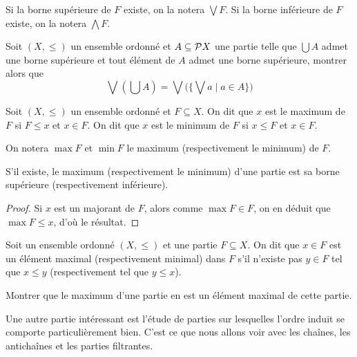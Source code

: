 \begin{notation}
  Si la borne supérieure de $F$ existe, on la notera $\bigvee F$. Si la borne
  inférieure de $F$ existe, on la notera $\bigwedge F$.
\end{notation}

\begin{exercise}
  Soit $(X,\leq)$ un ensemble ordonné et $A\subseteq \mathcal{P} X$ une partie
  telle que $\bigcup A$ admet une borne supérieure et tout élément de $A$ admet
  une borne supérieure, montrer alors que
  \[\bigvee (\bigcup A) =
  \bigvee\Big(\Big\{ \bigvee a \;\Big|\; a \in A\Big\}\Big)\]
\end{exercise}

\begin{definition}
  Soit $(X,\leq)$ un ensemble ordonné et $F\subseteq X$. On dit que $x$ est le
  maximum de $F$ si $F\leq x$ et $x\in F$. On dit que $x$ est le minimum de $F$
  si $x\leq F$ et $x\in F$.
\end{definition}

\begin{notation}
  On notera $\max F$ et $\min F$ le maximum (respectivement le minimum) de $F$.
\end{notation}

\begin{property}
  S'il existe, le maximum (respectivement le minimum) d'une partie est sa borne
  supérieure (respectivement inférieure).
\end{property}

\begin{proof}
  Si $x$ est un majorant de $F$, alors comme $\max F \in F$, on en déduit que
  $\max F \leq x$, d'où le résultat.
\end{proof}

\begin{definition}
  Soit un ensemble ordonné $(X,\leq)$ et une partie $F\subseteq X$. On dit que
  $x \in F$ est un élément maximal (respectivement minimal) dans $F$ s'il
  n'existe pas $y\in F$ tel que $x\leq y$ (respectivement tel que $y\leq x$).
\end{definition}

\begin{exercise}
  Montrer que le maximum d'une partie en est un élément maximal de cette partie.
\end{exercise}

Une autre partie intéressant est l'étude de parties sur lesquelles l'ordre
induit se comporte particulièrement bien. C'est ce que nous allons voir avec les
chaînes, les antichaînes et les parties filtrantes.

